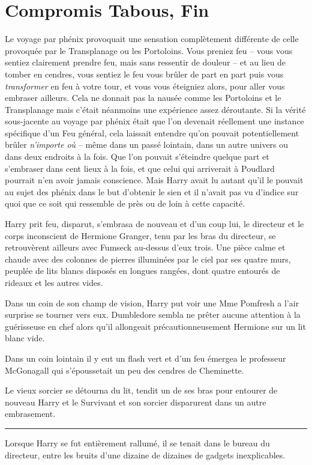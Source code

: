 
\chapter{Compromis Tabous, Fin}

Le voyage par phénix provoquait une sensation complètement différente de celle provoquée par le Transplanage ou les Portoloins. Vous preniez feu – vous vous sentiez clairement prendre feu, mais sans ressentir de douleur – et au lieu de tomber en cendres, vous sentiez le feu vous brûler de part en part puis vous \emph{transformer}  en feu à votre tour, et vous vous éteigniez alors, pour aller vous embraser ailleurs. Cela ne donnait pas la nausée comme les Portoloins et le Transplanage mais c'était néanmoins une expérience assez déroutante. Si la vérité sous-jacente au voyage par phénix était que l'on devenait réellement une instance spécifique d'un Feu général, cela laissait entendre qu'on pouvait potentiellement brûler \emph{n'importe où}  – même dans un passé lointain, dans un autre univers ou dans deux endroits à la fois. Que l'on pouvait s'éteindre quelque part et s'embraser dans cent lieux à la fois, et que celui qui arriverait à Poudlard pourrait n'en avoir jamais conscience. Mais Harry avait lu autant qu'il le pouvait au sujet des phénix dans le but d'obtenir le sien et il n'avait pas vu d'indice sur quoi que ce soit qui ressemble de près ou de loin à cette capacité.

Harry prit feu, disparut, s'embrasa de nouveau et d'un coup lui, le directeur et le corps inconscient de Hermione Granger, tenu par les bras du directeur, se retrouvèrent ailleurs avec Fumseck au-dessus d'eux trois. Une pièce calme et chaude avec des colonnes de pierres illuminées par le ciel par ses quatre murs, peuplée de lits blancs disposés en longues rangées, dont quatre entourés de rideaux et les autres vides.

Dans un coin de son champ de vision, Harry put voir une Mme Pomfresh a l'air surprise se tourner vers eux. Dumbledore sembla ne prêter aucune attention à la guérisseuse en chef alors qu'il allongeait précautionneusement Hermione sur un lit blanc vide.

Dans un coin lointain il y eut un flash vert et d'un feu émergea le professeur McGonagall qui s'époussetait un peu des cendres de Cheminette.

Le vieux sorcier se détourna du lit, tendit un de ses bras pour entourer de nouveau Harry et le Survivant et son sorcier disparurent dans un autre embrasement.
\par\noindent\rule{\textwidth}{0.4pt}
Lorsque Harry se fut entièrement rallumé, il se tenait dans le bureau du directeur, entre les bruits d'une dizaine de dizaines de gadgets inexplicables.

